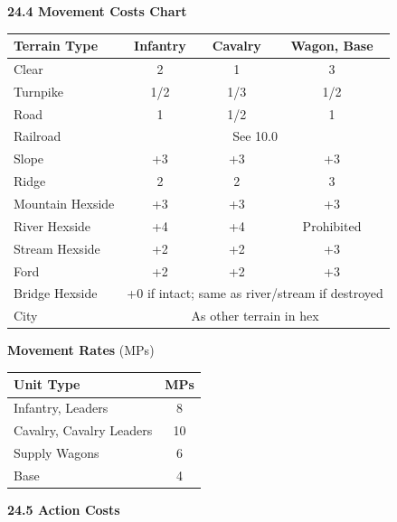 \par\medskip
\noindent
\begin{minipage}{\textwidth}
\textbf{24.4 Movement Costs Chart}

\vspace{0.4em}
\noindent
\begin{minipage}[t]{0.72\textwidth}
\centering
\scriptsize
\begin{tabular}{lccc}
\toprule
\textbf{Terrain Type} & \textbf{Infantry} & \textbf{Cavalry} & \textbf{Wagon, Base} \\
\midrule
Clear & 2 & 1 & 3 \\
Turnpike & 1/2 & 1/3 & 1/2 \\
Road & 1 & 1/2 & 1 \\
Railroad & \multicolumn{3}{c}{See 10.0} \\
Slope & +3 & +3 & +3 \\
Ridge & 2 & 2 & 3 \\
Mountain Hexside & +3 & +3 & +3 \\
River Hexside & +4 & +4 & Prohibited \\
Stream Hexside & +2 & +2 & +3 \\
Ford & +2 & +2 & +3 \\
Bridge Hexside & \multicolumn{3}{c}{+0 if intact; same as river/stream if destroyed} \\
City & \multicolumn{3}{c}{As other terrain in hex} \\
\bottomrule
\end{tabular}
\end{minipage}\hfill
\begin{minipage}[t]{0.24\textwidth}
\centering
\scriptsize
\textbf{Movement Rates} (MPs)

\vspace{0.3em}
\begin{tabular}{lc}
\toprule
\textbf{Unit Type} & \textbf{MPs} \\
\midrule
Infantry, Leaders & 8 \\
Cavalry, Cavalry Leaders & 10 \\
Supply Wagons & 6 \\
Base & 4 \\
\bottomrule
\end{tabular}
\end{minipage}
\end{minipage}

\par\medskip
\textbf{24.5 Action Costs}

